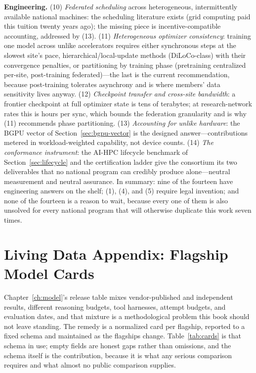\textbf{Engineering.} (10) \emph{Federated scheduling} across heterogeneous, intermittently available national machines: the scheduling literature exists (grid computing paid this tuition twenty years ago); the missing piece is incentive-compatible accounting, addressed by (13). (11) \emph{Heterogeneous optimizer consistency}: training one model across unlike accelerators requires either synchronous steps at the slowest site's pace, hierarchical/local-update methods (DiLoCo-class) with their convergence penalties, or partitioning by training phase (pretraining centralized per-site, post-training federated)---the last is the current recommendation, because post-training tolerates asynchrony and is where members' data sensitivity lives anyway. (12) \emph{Checkpoint transfer and cross-site bandwidth}: a frontier checkpoint at full optimizer state is tens of terabytes; at research-network rates this is hours per sync, which bounds the federation granularity and is why (11) recommends phase partitioning. (13) \emph{Accounting for unlike hardware}: the BGPU vector of Section~\ref{sec:bgpu-vector} is the designed answer---contributions metered in workload-weighted capability, not device counts. (14) \emph{The conformance instrument}: the AI-HPC lifecycle benchmark of Section~\ref{sec:lifecycle} and the certification ladder give the consortium its two deliverables that no national program can credibly produce alone---neutral measurement and neutral assurance. In summary: nine of the fourteen have engineering answers on the shelf; (1), (4), and (5) require legal invention; and none of the fourteen is a reason to wait, because every one of them is also unsolved for every national program that will otherwise duplicate this work seven times.

\chapter{Living Data Appendix: Flagship Model Cards}
\label{app:cards}

Chapter~\ref{ch:model}'s release table mixes vendor-published and independent results, different reasoning budgets, tool harnesses, attempt budgets, and evaluation dates, and that mixture is a methodological problem this book should not leave standing. The remedy is a normalized card per flagship, reported to a fixed schema and maintained as the flagships change. Table~\ref{tab:cards} is that schema in use; empty fields are honest gaps rather than omissions, and the schema itself is the contribution, because it is what any serious comparison requires and what almost no public comparison supplies.


